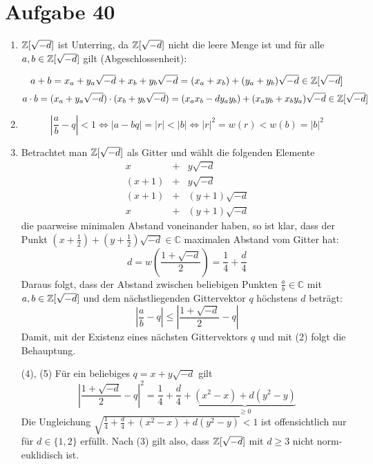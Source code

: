 \section*{Aufgabe 40}
\newcommand{\Zd}{\Z[\sqrt{-d}]}
\begin{enumerate}[(1)]
\item
	$\Zd$ ist Unterring, da $\Zd$ nicht die leere Menge ist und für alle
	$a, b \in \Zd$ gilt (Abgeschlossenheit):

	\[ a + b = x_a + y_a \sqrt{-d} + x_b + y_b \sqrt{-d} = (x_a + x_b) +
	(y_a + y_b) \sqrt{-d} \in \Zd \]
	\[ a \cdot b = (x_a + y_a \sqrt{-d}) \cdot (x_b + y_b \sqrt{-d}) = (x_a
	x_b - d y_a y_b) + (x_a y_b + x_b y_a) \sqrt{-d} \in \Zd \]

\item
	\[ \left| \frac{a}{b} - q \right| < 1 \Leftrightarrow \left|a -
	bq\right| = |r| < |b| \Leftrightarrow |r|^2 = w(r) < w(b) = |b|^2 \]

\item
	Betrachtet man $\Zd$ als Gitter und wählt die folgenden Elemente
	\begin{eqnarray*}
	x &+& y \sqrt{-d}\\
	(x+1) &+& y \sqrt{-d}\\
	(x+1) &+& (y+1) \sqrt{-d}\\
	x &+& (y+1) \sqrt{-d}
	\end{eqnarray*}
	die paarweise minimalen Abstand voneinander haben, so ist klar, dass
	der Punkt $(x+\frac{1}{2}) + (y+\frac{1}{2})\sqrt{-d} \in \mathbb{C}$
	maximalen Abstand vom Gitter hat:
	\[ d = w\left(\frac{1+\sqrt{-d}}{2}\right) = \frac{1}{4}+\frac{d}{4} \]
	Daraus folgt, dass der Abstand zwischen beliebigen Punkten $\frac{a}{b}
	\in \mathbb{C}$ mit $a, b \in \Zd$ und dem nächstliegenden Gittervektor
	$q$ höchstens $d$ beträgt:
	\[ \left|\frac{a}{b} - q\right| \leq \left|\frac{1+\sqrt{-d}}{2} -
	q\right| \]
	Damit, mit der Existenz eines nächsten Gittervektors $q$ und mit (2)
	folgt die Behauptung.
\item[(4), (5)]
	Für ein beliebiges $q = x + y \sqrt{-d}$ gilt
	\[ \left|\frac{1+\sqrt{-d}}{2} - q \right|^2 = \frac{1}{4}+\frac{d}{4}
	+ \underbrace{(x^2 - x) + d(y^2 - y)}_{\geq 0} \]
	Die Ungleichung $\sqrt{\frac{1}{4}+\frac{d}{4} + (x^2 - x) + d(y^2 -
	y)} < 1$ ist offensichtlich nur für $d \in \{1,2\}$ erfüllt. Nach (3)
	gilt also, dass $\Zd$ mit $d \geq 3$ nicht norm-euklidisch ist.
\end{enumerate}
